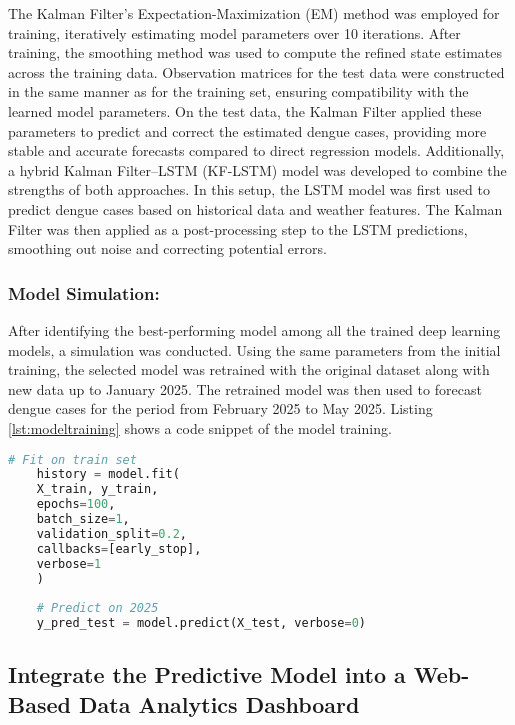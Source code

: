 The Kalman Filter's Expectation-Maximization (EM) method was employed for training, iteratively estimating model parameters over 10 iterations. After training, the smoothing method was used to compute the refined state estimates across the training data. Observation matrices for the test data were constructed in the same manner as for the training set, ensuring compatibility with the learned model parameters. On the test data, the Kalman Filter applied these parameters to predict and correct the estimated dengue cases, providing more stable and accurate forecasts compared to direct regression models. Additionally, a hybrid Kalman Filter–LSTM (KF-LSTM) model was developed to combine the strengths of both approaches. In this setup, the LSTM model was first used to predict dengue cases based on historical data and weather features. The Kalman Filter was then applied as a post-processing step to the LSTM predictions, smoothing out noise and correcting potential errors.

\subsubsection{Model Simulation:}
After identifying the best-performing model among all the trained deep learning models, a simulation was conducted. Using the same parameters from the initial training, the selected model was retrained with the original dataset along with new data up to January 2025. The retrained model was then used to forecast dengue cases for the period from February 2025 to May 2025. Listing \ref{lst:modeltraining} shows a code snippet of the model training.

\begin{lstlisting}[language=Python, 
	basicstyle=\ttfamily\small, 
	keywordstyle=\color{blue}, 
	caption={Code Snippet for Model Training}, 
	label={lst:modeltraining}]
	# Fit on train set
	history = model.fit(
	X_train, y_train,
	epochs=100,
	batch_size=1,
	validation_split=0.2,
	callbacks=[early_stop],
	verbose=1
	)
	
	# Predict on 2025
	y_pred_test = model.predict(X_test, verbose=0)
\end{lstlisting}



\subsection{Integrate the Predictive Model into a Web-Based Data Analytics Dashboard}

